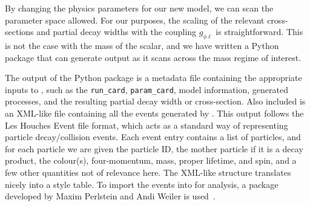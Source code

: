 By changing the physics parameters for our new model, we can scan the parameter space allowed.
For our purposes, the scaling of the relevant cross-sections and partial decay widths with the coupling $g_{\phi\ell}$ is straightforward.
This is not the case with the mass of the scalar, and we have written a Python package that can generate \madgraph output as it scans across the mass regime of interest.

The output of the Python package is a metadata file containing the appropriate inputs to \madgraph, such as the \texttt{run\_card}, \texttt{param\_card}, model information, generated processes, and the resulting partial decay width or cross-section.
Also included is an XML-like file containing all the events generated by \madgraph.
This output follows the Les Houches Event file format\cite{Alwall:2006yp}, which acts as a standard way of representing particle decay/collision events.
Each event entry contains a list of particles, and for each particle we are given the particle ID, the mother particle if it is a decay product, the colour(s), four-momentum, mass, proper lifetime, and spin, and a few other quantities not of relevance here.
The XML-like structure translates nicely into a \mathematica style table.
To import the events into \mathematica for analysis, a \mathematica package developed by Maxim Perlstein and Andi Weiler is used~\cite{Tanedo:2011}.
